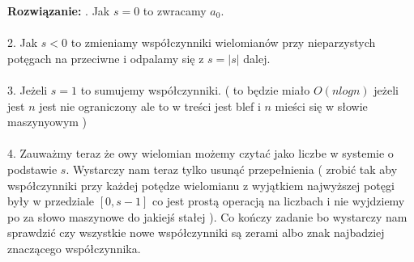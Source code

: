  \textbf{Rozwiązanie:} 
 \newline
 . Jak $s = 0$ to zwracamy $a_0$. \\ \\ 
 2. Jak $s < 0$ to zmieniamy współczynniki wielomianów przy nieparzystych potęgach na przeciwne i odpalamy się z $s = |s|$ dalej. \\ \\
 3. Jeżeli $s = 1$ to sumujemy współczynniki. ( to będzie miało $O(n log n)$ jeżeli jest $n$ jest nie ograniczony ale to w treści jest blef i $n$ mieści się w słowie maszynyowym ) \\ \\
 4. Zauważmy teraz że owy wielomian możemy czytać jako liczbe w systemie o podstawie $s$. Wystarczy nam teraz tylko usunąć przepełnienia ( zrobić tak aby współczynniki przy każdej potędze wielomianu z wyjątkiem najwyższej potęgi były w przedziale $[0,s-1]$ co jest prostą operacją na liczbach i nie wyjdziemy po za słowo maszynowe do jakiejś stałej ). Co kończy zadanie bo wystarczy nam sprawdzić czy wszystkie nowe współczynniki są zerami albo znak najbadziej znaczącego współczynnika.